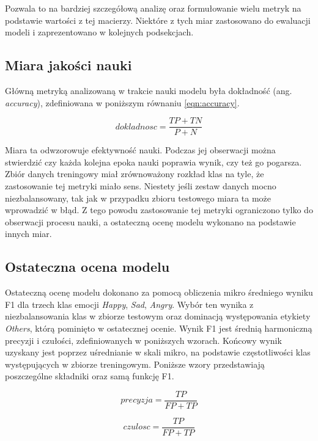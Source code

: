 Pozwala to na bardziej szczegółową analizę oraz formułowanie wielu metryk na podstawie wartości z tej macierzy. Niektóre z tych miar zastosowano do ewaluacji modeli i zaprezentowano w kolejnych podsekcjach.

\subsection{Miara jakości nauki}

Główną metryką analizowaną w trakcie nauki modelu była dokładność (ang. \textit{accuracy}), zdefiniowana w poniższym równaniu \ref{eqn:accuracy}.

\begin{equation}
\label{eqn:accuracy}
dokladnosc=\frac{TP + TN}{P + N}
\end{equation}

Miara ta odwzorowuje efektywność nauki. Podczas jej obserwacji można stwierdzić czy każda kolejna epoka nauki poprawia wynik, czy też go pogarsza. Zbiór danych treningowy miał zrównoważony rozkład klas na tyle, że zastosowanie tej metryki miało sens. Niestety jeśli zestaw danych mocno niezbalansowany, tak jak w przypadku zbioru testowego miara ta może wprowadzić w błąd. Z tego powodu zastosowanie tej metryki ograniczono tylko do obserwacji procesu nauki, a ostateczną ocenę modelu wykonano na podstawie innych miar.

\subsection{Ostateczna ocena modelu}

Ostateczną ocenę modelu dokonano za pomocą obliczenia mikro średniego wyniku F1 dla trzech klas emocji \textit{Happy}, \textit{Sad}, \textit{Angry}. Wybór ten wynika z niezbalansowania klas w zbiorze testowym oraz dominacją występowania etykiety \textit{Others}, którą pominięto w ostatecznej ocenie. Wynik F1 jest średnią harmoniczną precyzji i czułości, zdefiniowanych w poniższych wzorach. Końcowy wynik uzyskany jest poprzez uśrednianie w skali mikro, na podstawie częstotliwości klas występujących w zbiorze treningowym. Poniższe wzory przedstawiają poszczególne składniki oraz samą funkcję F1.

\begin{equation}
\label{eqn:precyzja}
precyzja = \frac{TP}{FP+TP}
\end{equation}

\begin{equation}
\label{eqn:czułość}
czulosc = \frac{TP}{FP+TP}
\end{equation}

